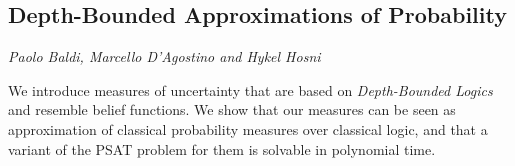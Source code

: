 \documentclass[../booklet.tex]{subfiles}
\begin{document}
\subsection[Depth-Bounded Approximations of Probability. {\it Paolo Baldi, Marcello D'Agostino and Hykel Hosni}]{Depth-Bounded Approximations of Probability}
  

\begin{center}
  {\it Paolo Baldi, Marcello D'Agostino and Hykel Hosni}
\end{center}

\vskip 0.8cm


We introduce measures of uncertainty that are based on {\em Depth-Bounded Logics} and resemble belief functions. We show that our measures can be seen as approximation of classical probability measures over classical logic, and that 
a variant of the PSAT problem for them is solvable in polynomial time. 
\end{document}
